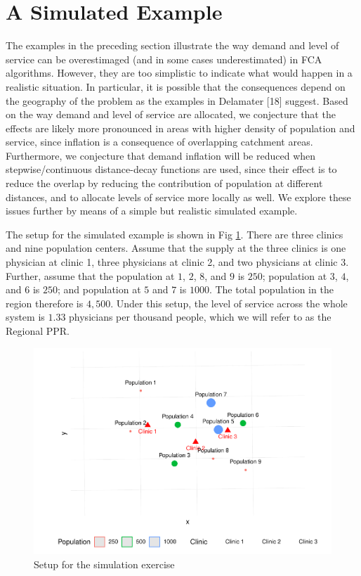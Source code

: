 \documentclass[10pt,letterpaper]{article}
\begin{document}
\section{A Simulated Example}\label{a-simulated-example}

The examples in the preceding section illustrate the way demand and
level of service can be overestimaged (and in some cases underestimated)
in FCA algorithms. However, they are too simplistic to indicate what
would happen in a realistic situation. In particular, it is possible
that the consequences depend on the geography of the problem as the
examples in Delamater {[}18{]} suggest. Based on the way demand and
level of service are allocated, we conjecture that the effects are
likely more pronounced in areas with higher density of population and
service, since inflation is a consequence of overlapping catchment
areas. Furthermore, we conjecture that demand inflation will be reduced
when stepwise/continuous distance-decay functions are used, since their
effect is to reduce the overlap by reducing the contribution of
population at different distances, and to allocate levels of service
more locally as well. We explore these issues further by means of a
simple but realistic simulated example.

The setup for the simulated example is shown in Fig
\ref{fig:fig6-simulation}. There are three clinics and nine population
centers. Assume that the supply at the three clinics is one physician at
clinic 1, three physicians at clinic 2, and two physicians at clinic 3.
Further, assume that the population at \(1\), \(2\), \(8\), and \(9\) is
\(250\); population at \(3\), \(4\), and \(6\) is \(250\); and
population at \(5\) and \(7\) is \(1000\). The total population in the
region therefore is \(4,500\). Under this setup, the level of service
across the whole system is \(1.33\) physicians per thousand people,
which we will refer to as the Regional PPR.

\begin{figure}
\includegraphics[width=0.95\linewidth]{Supply_and_Demand_Inflation_in_FCA_Methods_v2.0_files/figure-latex/fig6-simulation-1} \caption{\label{fig:fig6-simulation}Setup for the simulation exercise}\label{fig:fig6-simulation}
\end{figure}
\end{document}
